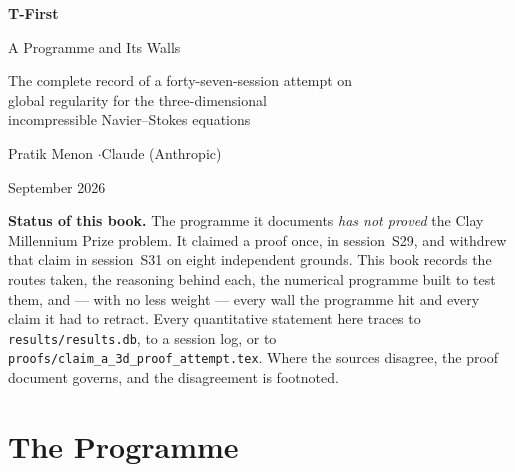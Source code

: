 \documentclass[11pt]{book}
\theoremstyle{definition}
\theoremstyle{remark}
\begin{document}
\frontmatter

\begin{titlepage}
\centering
\vspace*{2.5cm}
{\Huge\bfseries T-First\par}
\vspace{0.6cm}
{\LARGE A Programme and Its Walls\par}
\vspace{1.6cm}
{\large The complete record of a forty-seven-session attempt on\\
global regularity for the three-dimensional\\
incompressible Navier--Stokes equations\par}
\vspace{2.2cm}
{\large Pratik Menon \quad$\cdot$\quad Claude (Anthropic)\par}
\vspace{0.8cm}
{\large September 2026\par}
\vfill
\begin{minipage}{0.82\textwidth}
\small
\textbf{Status of this book.} The programme it documents \emph{has not proved}
the Clay Millennium Prize problem. It claimed a proof once, in session~S29,
and withdrew that claim in session~S31 on eight independent grounds. This
book records the routes taken, the reasoning behind each, the numerical
programme built to test them, and --- with no less weight --- every wall the
programme hit and every claim it had to retract. Every quantitative statement
here traces to \texttt{results/results.db}, to a session log, or to
\texttt{proofs/claim\_a\_3d\_proof\_attempt.tex}. Where the sources disagree,
the proof document governs, and the disagreement is footnoted.
\end{minipage}
\vspace{1.5cm}
\end{titlepage}

\tableofcontents
\listoffigures
\listoftables



\mainmatter

\part{The Programme}




\end{document}
